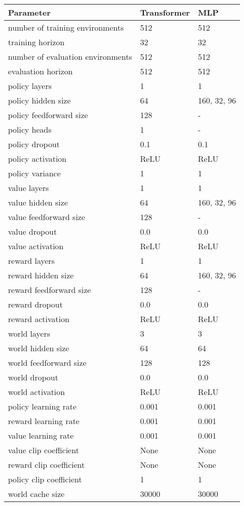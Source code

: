 \begin{tabular}{ l l l}
	\toprule
	Parameter & Transformer & MLP \\
	\midrule
	number of training environments & 512 & 512 \\
	training horizon & 32 & 32 \\
	number of evaluation environments & 512 & 512 \\
	evaluation horizon & 512 & 512 \\
	policy layers & 1 & 1 \\
	policy hidden size & 64 & {160, 32, 96} \\
	policy feedforward size & 128 & - \\
	policy heads & 1 & - \\
	policy dropout & 0.1 & 0.1 \\
	policy activation & ReLU & ReLU \\
	policy variance & 1 & 1 \\
	value layers & 1 & 1 \\
	value hidden size & 64 & {160, 32, 96} \\
	value feedforward size & 128 & - \\
	value dropout & 0.0 & 0.0 \\
	value activation & ReLU & ReLU \\
	reward layers & 1 & 1 \\
	reward hidden size & 64 & {160, 32, 96} \\
	reward feedforward size & 128 & - \\
	reward dropout & 0.0 & 0.0 \\
	reward activation & ReLU & ReLU \\
	world layers & 3 & 3 \\
	world hidden size & 64 & 64 \\
	world feedforward size & 128 & 128 \\
	world dropout & 0.0 & 0.0 \\
	world activation & ReLU & ReLU \\
	policy learning rate & 0.001 & 0.001 \\
	reward learning rate & 0.001 & 0.001 \\
	value learning rate & 0.001 & 0.001 \\
	value clip coefficient & None & None \\
	reward clip coefficient & None & None \\
	policy clip coefficient & 1 & 1 \\
	world cache size & 30000 & 30000 \\

\end{tabular}
